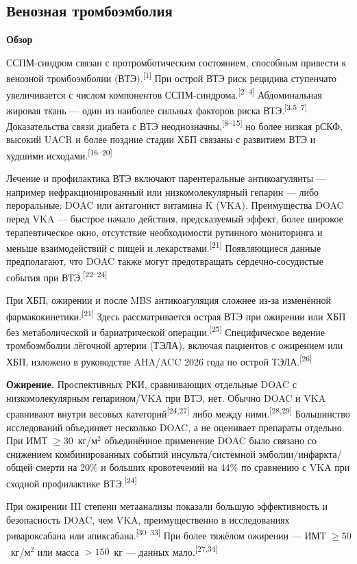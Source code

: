 \documentclass[11pt,a4paper]{article}
\newcommand{\src}[1]{\textsuperscript{[#1]}}
\newcommand{\heading}[1]{\par\medskip\textbf{#1}\par}
\begin{document}
\subsection{Венозная тромбоэмболия}
\heading{Обзор}
ССПМ-синдром связан с протромботическим состоянием, способным привести к венозной тромбоэмболии (ВТЭ).\src{1} При острой ВТЭ риск рецидива ступенчато увеличивается с числом компонентов ССПМ-синдрома.\src{2--4} Абдоминальная жировая ткань --- один из наиболее сильных факторов риска ВТЭ.\src{3,5--7} Доказательства связи диабета с ВТЭ неоднозначны,\src{8--15} но более низкая рСКФ, высокий UACR и более поздние стадии ХБП связаны с развитием ВТЭ и худшими исходами.\src{16--20}

Лечение и профилактика ВТЭ включают парентеральные антикоагулянты --- например нефракционированный или низкомолекулярный гепарин --- либо пероральные: DOAC или антагонист витамина K (VKA). Преимущества DOAC перед VKA --- быстрое начало действия, предсказуемый эффект, более широкое терапевтическое окно, отсутствие необходимости рутинного мониторинга и меньше взаимодействий с пищей и лекарствами.\src{21} Появляющиеся данные предполагают, что DOAC также могут предотвращать сердечно-сосудистые события при ВТЭ.\src{22--24}

При ХБП, ожирении и после MBS антикоагуляция сложнее из-за изменённой фармакокинетики.\src{21} Здесь рассматривается острая ВТЭ при ожирении или ХБП без метаболической и бариатрической операции.\src{25} Специфическое ведение тромбоэмболии лёгочной артерии (ТЭЛА), включая пациентов с ожирением или ХБП, изложено в руководстве AHA/ACC 2026 года по острой ТЭЛА.\src{26}

\textbf{Ожирение.} Проспективных РКИ, сравнивающих отдельные DOAC с низкомолекулярным гепарином/VKA при ВТЭ, нет. Обычно DOAC и VKA сравнивают внутри весовых категорий\src{24,27} либо между ними.\src{28,29} Большинство исследований объединяет несколько DOAC, а не оценивает препараты отдельно. При ИМТ $\geq30$~кг/м$^2$ объединённое применение DOAC было связано со снижением комбинированных событий инсульта/системной эмболии/инфаркта/общей смерти на 20\% и больших кровотечений на 44\% по сравнению с VKA при сходной профилактике ВТЭ.\src{24}

При ожирении III степени метаанализы показали большую эффективность и безопасность DOAC, чем VKA, преимущественно в исследованиях ривароксабана или апиксабана.\src{30--33} При более тяжёлом ожирении --- ИМТ $\geq50$~кг/м$^2$ или масса $>150$~кг --- данных мало.\src{27,34}
\end{document}
